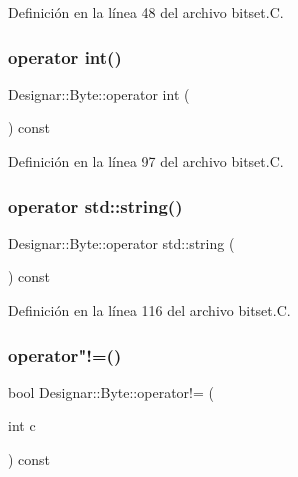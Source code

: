 Definición en la línea 48 del archivo bitset.\+C.

\mbox{\label{class_designar_1_1_byte_a807f2afe5c5d15112b2a349e54142265}} 
\subsubsection{\texorpdfstring{operator int()}{operator int()}}
{\footnotesize\ttfamily Designar\+::\+Byte\+::operator int (\begin{DoxyParamCaption}{ }\end{DoxyParamCaption}) const}



Definición en la línea 97 del archivo bitset.\+C.

\mbox{\label{class_designar_1_1_byte_ac37e3eaea04d1bdb09b04a1dd94a852d}} 
\subsubsection{\texorpdfstring{operator std\+::string()}{operator std::string()}}
{\footnotesize\ttfamily Designar\+::\+Byte\+::operator std\+::string (\begin{DoxyParamCaption}{ }\end{DoxyParamCaption}) const}



Definición en la línea 116 del archivo bitset.\+C.

\mbox{\label{class_designar_1_1_byte_a24733d65e2f520be23ae6eb55ca195c1}} 
\subsubsection{\texorpdfstring{operator"!=()}{operator!=()}}
{\footnotesize\ttfamily bool Designar\+::\+Byte\+::operator!= (\begin{DoxyParamCaption}\item[{int}]{c }\end{DoxyParamCaption}) const}



